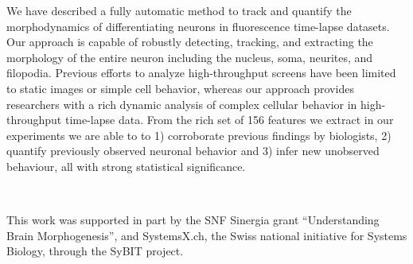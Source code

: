 
We have described a fully automatic method to
track and quantify the morphodynamics of
differentiating neurons in fluorescence time-lapse
datasets.  Our approach is capable of robustly
detecting, tracking, and extracting the morphology
of the entire neuron including the nucleus, soma,
neurites, and filopodia.  Previous efforts to
analyze high-throughput screens have been limited
to static images or simple cell behavior, whereas
our approach provides researchers with a rich
dynamic analysis of complex cellular behavior in
high-throughput time-lapse data.  From the rich
set of 156 features we extract in our experiments
we are able to to 1) corroborate previous findings
by biologists, 2) quantify previously observed
neuronal behavior and 3) infer new unobserved
behaviour, all with strong statistical
significance.  

\vspace{4mm}
\begin{centering}
 \\
\vspace{2mm}
\end{centering}
This work was supported in part by the SNF Sinergia grant
``Understanding Brain Morphogenesis'', and SystemsX.ch,
the Swiss national initiative for Systems Biology,
through the SyBIT project.













